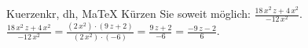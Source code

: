 \begin{MAufgabe}{Kuerzen}{kr, dh, MaTeX}
K\"urzen Sie soweit m\"oglich: $\frac{18\, x^2\, z + 4\, x^2}{- 12\, x^2}$.\\ 
\ifLsg\MLoesung
\quad $\frac{18\, x^2\, z + 4\, x^2}{- 12\, x^2}=\frac{(2\, x^2)\cdot(9\, z + 2)}{(2\, x^2)\cdot(-6)}=\frac{9\, z + 2}{-6}=\frac{ - 9\, z - 2}{6}$.\else\relax\fi
 \end{MAufgabe}